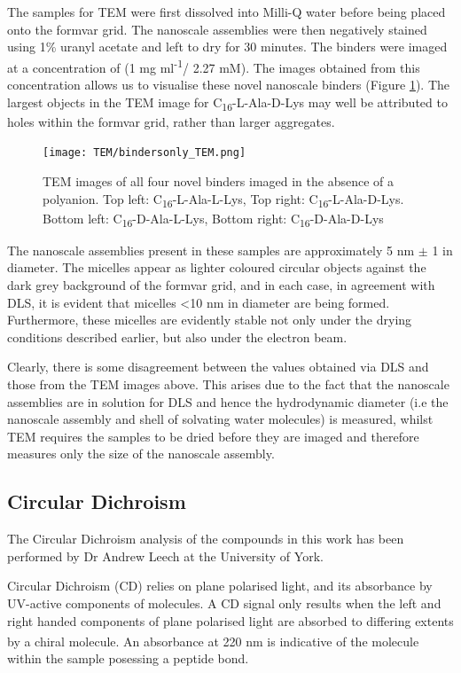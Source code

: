 The samples for TEM were first dissolved into Milli-Q water before being placed onto the formvar grid. The nanoscale assemblies were then negatively stained using 1\% uranyl acetate and left to dry for 30 minutes. 
\newline
The binders were imaged at a concentration of (1 mg ml\textsuperscript{-1}/ 2.27 mM). %
The images obtained from this concentration allows us to visualise these novel nanoscale binders (Figure \ref{TEM_2}). The largest objects in the TEM image for C\textsubscript{16}-L-Ala-D-Lys may well be attributed to holes within the formvar grid, rather than larger aggregates.
\newpage
\begin{figure} [h!]
\centering
\texttt{[image: TEM/bindersonly\_TEM.png]}
\caption{TEM images of all four novel binders imaged in the absence of a polyanion. 
Top left: C\textsubscript{16}-L-Ala-L-Lys, Top right: C\textsubscript{16}-L-Ala-D-Lys. Bottom left: C\textsubscript{16}-D-Ala-L-Lys, Bottom right: C\textsubscript{16}-D-Ala-D-Lys}
\label{TEM_2}
\end{figure}
The nanoscale assemblies present in these samples are approximately 5 nm $\pm$ 1 in diameter. The micelles appear as lighter coloured circular objects against the dark grey background of the formvar grid, and in each case, in agreement with DLS, it is evident that micelles <10 nm in diameter are being formed. Furthermore, these micelles are evidently stable not only under the drying conditions described earlier, but also under the electron beam.  

Clearly, there is some disagreement between the values obtained via DLS and those from the TEM images above. This arises due to the fact that the nanoscale assemblies are in solution for DLS and hence the hydrodynamic diameter (i.e the nanoscale assembly and shell of solvating water molecules) is measured, whilst TEM requires the samples to be dried before they are imaged and therefore measures only the size of the nanoscale assembly.

\subsection{Circular Dichroism}
The Circular Dichroism analysis of the compounds in this work has been performed by Dr Andrew Leech at the University of York. 

Circular Dichroism (CD) relies on plane polarised light, and its absorbance by UV-active components of molecules.  A CD signal only results when the left and right handed components of plane polarised light are absorbed to differing extents by a chiral molecule.\textsuperscript{\cite{Kelly2005HowDichroism}} An absorbance at 220 nm is indicative of the molecule within the sample posessing a peptide bond.  

